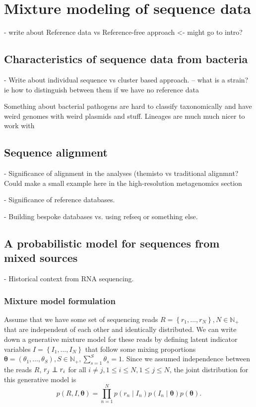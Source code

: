 \documentclass[officiallayout]{tktla}
\newcommand\indept{\protect\mathpalette{\protect\independenT}{\perp}}
\def\independenT#1#2{\mathrel{\rlap{$#1#2$}\mkern2mu{#1#2}}}
\begin{document}
\chapter{Mixture modeling of sequence data}

- write about Reference data vs Reference-free approach <- might go to intro?

\section{Characteristics of sequence data from bacteria}
\label{section:bacterial-data}

- Write about individual sequence vs cluster based approach.
-- what is a strain? ie how to distinguish between them if we have no reference data

Something about bacterial pathogens are hard to classify taxonomically
and have weird genomes with weird plasmids and stuff.  Lineages are
much much nicer to work with

\section{Sequence alignment}
\label{section:sequence-alignment}
- Significance of alignment in the analyses (themisto vs traditional alignmnt? Could make a small example here in the high-resolution metagenomics section

- Significance of reference databases.

- Building bespoke databases vs. using refseq or something else.

\section{A probabilistic model for sequences from mixed sources}

- Historical context from RNA sequencing.

\subsection{Mixture model formulation}

Assume that we have some set of sequencing reads $R = \left\{r_{1},
\dots, r_{N}\right\}, N \in \mathbb{N}_{+}$ that are independent of
each other and identically distributed. We can write down a generative
mixture model for these reads by defining latent indicator variables
$I = \left\{I_{1}, \dots, I_{N}\right\}$ that follow some mixing
proportions $\boldsymbol{\theta} = \left(\theta_{1}, \dots,
\theta_{S}\right), S \in \mathbb{N}_{+}, \sum_{s = 1}^{S} \theta_{s} =
1$. Since we assumed independence between the reads $R$, $r_{j}
\indept r_{i}$ for all $i \neq j, 1 \leq i \leq N, 1 \leq j \leq N$, the joint
distribution for this generative model is
\begin{equation}
  \label{model:joint-distribution}
  p\left(R, I, \boldsymbol\theta\right) = \prod_{n = 1}^{N}p\left(r_{n} \middle| I_{n}\right) p\left(I_{n} \middle| \boldsymbol\theta\right)p\left(\boldsymbol\theta\right).
\end{equation}
\end{document}
